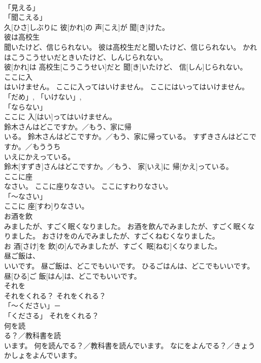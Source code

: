 \documentclass[8pt]{extreport}
\begin{document}
\begin{CJK}{UTF8}{min}
\\	「見える」 
\\	「聞こえる」 
\\	久[ひさ]しぶりに 彼[かれ]の 声[こえ]が 聞[き]けた。		
\\	彼は高校生
\\	聞いたけど、信じられない。	彼は高校生だと聞いたけど、信じられない。	かれはこうこうせいだときいたけど、しんじられない。	
\\	彼[かれ]は 高校生[こうこうせい]だと 聞[き]いたけど、 信[しん]じられない。		
\\	ここに入
\\	はいけません。	ここに入ってはいけません。	ここにはいってはいけません。	
\\	「だめ」, 「いけない」, 
\\	「ならない」 
\\	ここに 入[はい]ってはいけません。		
\\	鈴木さんはどこですか。／もう、家に帰
\\	いる。	鈴木さんはどこですか。／もう、家に帰っている。	すずきさんはどこですか。／もう{うち
\\	いえ}にかえっている。	
\\	鈴木[すずき]さんはどこですか。／もう、 家[いえ]に 帰[かえ]っている。		
\\	ここに座
\\	なさい。	ここに座りなさい。	ここにすわりなさい。	
\\	「～なさい」 
\\	ここに 座[すわ]りなさい。		
\\	お酒を飲
\\	みましたが、すごく眠くなりました。	お酒を飲んでみましたが、すごく眠くなりました。	おさけをのんでみましたが、すごくねむくなりました。	
\\	お 酒[さけ]を 飲[の]んでみましたが、すごく 眠[ねむ]くなりました。		
\\	昼ご飯は、
\\	いいです。	昼ご飯は、どこでもいいです。	ひるごはんは、どこでもいいです。	
\\	昼[ひる]ご 飯[はん]は、どこでもいいです。		
\\	それを
\\	それをくれる？	それをくれる？	
\\	「～ください」－ 
\\	「くださる」	それをくれる？		
\\	何を読
\\	る？／教科書を読
\\	います。	何を読んでる？／教科書を読んでいます。	なにをよんでる？／きょうかしょをよんでいます。	

\end{CJK}
\end{document}
